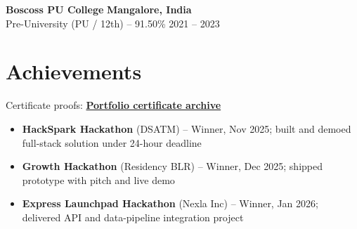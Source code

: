 \documentclass[9pt,letterpaper]{article}
\newcommand{\resumeSubheading}[4]{%
  \vspace{1pt}%
  \textbf{#1} \hfill {\bfseries #2}\\[2pt]
  {#3} \hfill {\color{muted}\small #4}\par\vspace{1pt}%
}
\newcommand{\resumeItem}{\item}
\newcommand{\resumelink}[2]{\href{#1}{\textbf{#2}}}
\begin{document}
\resumeSubheading
  {Boscoss PU College}{Mangalore, India}
  {Pre-University (PU / 12th) -- 91.50\%}{2021 -- 2023}

\section{Achievements}
\small Certificate proofs: \resumelink{http://shashankva.me/}{Portfolio certificate archive}\normalsize
\begin{itemize}[leftmargin=*, nosep, topsep=1pt, itemsep=0pt]
  \resumeItem{\textbf{HackSpark Hackathon} (DSATM) -- Winner, Nov 2025; built and demoed full-stack solution under 24-hour deadline}
  \resumeItem{\textbf{Growth Hackathon} (Residency BLR) -- Winner, Dec 2025; shipped prototype with pitch and live demo}
  \resumeItem{\textbf{Express Launchpad Hackathon} (Nexla Inc) -- Winner, Jan 2026; delivered API and data-pipeline integration project}
\end{itemize}
\end{document}
